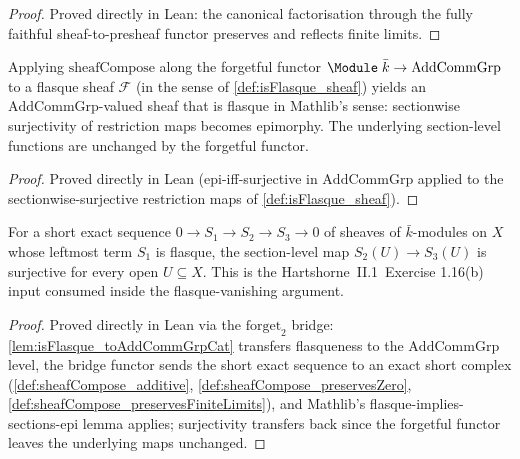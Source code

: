 \begin{proof}\leanok
 Proved directly in Lean: the canonical factorisation
  through the fully faithful sheaf-to-presheaf functor preserves and
  reflects finite limits.
\end{proof}

\begin{lemma}
  \label{lem:isFlasque_toAddCommGrpCat}
  Applying \(\mathrm{sheafCompose}\) along the forgetful functor
  \(\Module\;\bar k \to \mathrm{AddCommGrp}\) to a flasque sheaf
  \(\mathcal F\) (in the sense of \cref{def:isFlasque_sheaf}) yields an
  \(\mathrm{AddCommGrp}\)-valued sheaf that is flasque in Mathlib's
  sense: sectionwise surjectivity of restriction maps becomes
  epimorphy. The underlying section-level functions are unchanged by the
  forgetful functor.
\end{lemma}

\begin{proof}\leanok
 Proved directly in Lean (epi-iff-surjective in
  \(\mathrm{AddCommGrp}\) applied to the sectionwise-surjective
  restriction maps of \cref{def:isFlasque_sheaf}).
\end{proof}

\begin{lemma}
  \label{lem:isFlasque_shortExact_app_surjective}
  For a short exact sequence \(0 \to S_1 \to S_2 \to S_3 \to 0\) of
  sheaves of \(\bar k\)-modules on \(X\) whose leftmost term \(S_1\) is
  flasque, the section-level map \(S_2(U) \to S_3(U)\) is surjective for
  every open \(U \subseteq X\). This is the Hartshorne~II.1~Exercise
  1.16(b) input consumed inside the flasque-vanishing argument.
\end{lemma}

\begin{proof}\leanok
 Proved directly in Lean via the \(\mathrm{forget}_2\)
  bridge: \cref{lem:isFlasque_toAddCommGrpCat} transfers flasqueness to
  the \(\mathrm{AddCommGrp}\) level, the bridge functor sends the short
  exact sequence to an exact short complex
  (\cref{def:sheafCompose_additive},
  \cref{def:sheafCompose_preservesZero},
  \cref{def:sheafCompose_preservesFiniteLimits}), and Mathlib's
  flasque-implies-sections-epi lemma applies; surjectivity transfers
  back since the forgetful functor leaves the underlying maps unchanged.
\end{proof}

